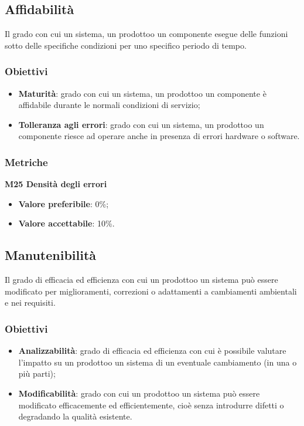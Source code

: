     \subsection{Affidabilità}
        Il grado con cui un sistema, un prodotto\glosp o un componente esegue delle funzioni sotto delle specifiche condizioni per uno specifico periodo di tempo.
        \subsubsection{Obiettivi}
            \begin{itemize}
                \item \textbf{Maturità}: grado con cui un sistema, un prodotto\glosp o un componente è affidabile durante le normali condizioni di servizio;
                \item \textbf{Tolleranza agli errori}: grado con cui un sistema, un prodotto\glosp o un componente riesce ad operare anche in presenza di errori hardware o software.
            \end{itemize}
        \subsubsection{Metriche}
            \textbf{M25 Densità degli errori}
                \begin{itemize}
                    \item \textbf{Valore preferibile}: 0\%;
                    \item \textbf{Valore accettabile}: 10\%.
                \end{itemize}
    \subsection{Manutenibilità}
        Il grado di efficacia ed efficienza con cui un prodotto\glosp o un sistema può essere modificato per miglioramenti, correzioni o adattamenti a cambiamenti ambientali e nei requisiti.
        \subsubsection{Obiettivi}
        \begin{itemize}
            \item \textbf{Analizzabilità}: grado di efficacia ed efficienza con cui è possibile valutare l'impatto su un prodotto\glosp o un sistema di un eventuale cambiamento (in una o più parti);
            \item \textbf{Modificabilità}: grado con cui un prodotto\glosp o un sistema può essere modificato efficacemente ed efficientemente, cioè senza introdurre difetti o degradando la qualità esistente.
        \end{itemize}
